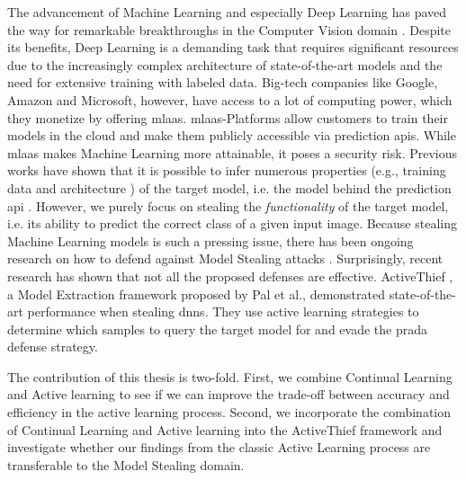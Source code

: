 \Abstract
The advancement of Machine Learning and especially Deep Learning has paved the way for remarkable breakthroughs in the Computer Vision domain \cite{he2016deep}
\cite{goodfellow2020generative} \cite{lecun1989backpropagation}. Despite its benefits, Deep Learning is a demanding task that requires significant resources due
to the increasingly complex architecture of state-of-the-art models and the need for extensive training with labeled data. Big-tech companies like Google,
Amazon and Microsoft, however, have access to a lot of computing power, which they monetize by offering \gls{mlaas}. \gls{mlaas}-Platforms allow customers to
train their models in the cloud and make them publicly accessible via prediction \glspl{api}. While \gls{mlaas} makes Machine Learning more
attainable, it poses a security risk. Previous works have shown that it is possible to infer numerous properties (e.g., training data \cite{shokri2017membership}
and architecture \cite{oh2019towards}) of the target model, i.e. the model behind the prediction \gls{api} \cite{tramer2016stealing}
\cite{papernot2017practical}. However, we purely focus on stealing the \textit{functionality} of the target model, i.e. its ability to predict the correct class
of a given input image. Because stealing Machine Learning models is such a pressing issue, there has been ongoing research on how to defend against Model Stealing
attacks \cite{orekondy2019prediction} \cite{juuti2019prada}. Surprisingly, recent research has shown that not all the proposed defenses are effective.
ActiveThief \cite{pal2020activethief}, a Model Extraction framework proposed by Pal et al., demonstrated state-of-the-art performance when stealing \glspl{dnn}.
They use active learning strategies to determine which samples to query the target model for and evade the \gls{prada} \cite{juuti2019prada} defense strategy. \par
The contribution of this thesis is two-fold. First, we combine Continual Learning and Active learning to see if we can improve the trade-off between accuracy and 
efficiency in the active learning process. Second, we incorporate the combination of Continual Learning and Active learning into the ActiveThief framework and
investigate whether our findings from the classic Active Learning process are transferable to the Model Stealing domain.
